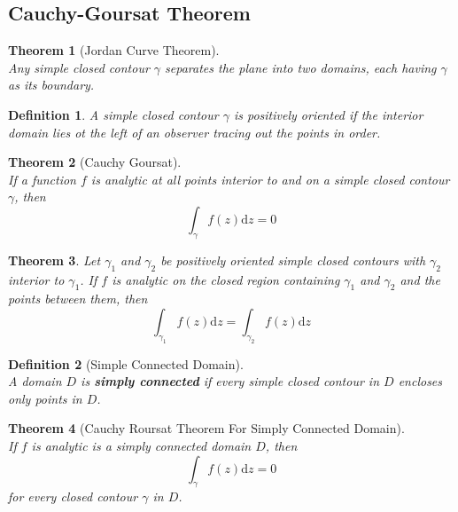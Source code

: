 \documentclass[12pt]{article}
\newcommand{\diff}{\mathrm{d}}
\newtheorem{definition}{Definition}[section]
\newtheorem{theorem}{Theorem}[section]
\theoremstyle{definition}
\begin{document}
\subsection{Cauchy-Goursat Theorem}
\begin{theorem}[Jordan Curve Theorem]
\hfill\\\normalfont Any simple closed contour $\gamma$ separates the plane into two domains, each having $\gamma$ as its boundary.
\end{theorem}
\begin{definition} \normalfont A simple closed contour $\gamma$ is positively oriented if the interior domain lies ot the left of an observer tracing out the points in order.
\end{definition}
\begin{theorem}[Cauchy Goursat]
\hfill\\\normalfont If a function $f$ is analytic at all points interior to and on a simple closed contour $\gamma$, then
\[
\int_{\gamma}f(z)\diff z = 0
\]
\end{theorem}
\begin{theorem}\normalfont Let $\gamma_1$ and $\gamma_2$ be positively oriented simple closed contours with $\gamma_2$ interior to $\gamma_1$. If $f$ is analytic on the closed region containing $\gamma_1$ and $\gamma_2$ and the points between them, then
\[
\int_{\gamma_1}f(z)\diff z = \int_{\gamma_2}f(z)\diff z
\]
\end{theorem}
\begin{definition}[Simple Connected Domain]
\hfill\\\normalfont A domain $D$ is \textbf{simply connected} if every simple closed contour in $D$ encloses only points in $D$.
\end{definition}
\begin{theorem}[Cauchy Roursat Theorem For Simply Connected Domain]
\hfill\\\normalfont If $f$ is analytic is a simply connected domain $D$, then
\[
\int_{\gamma}f(z)\diff z = 0
\]
for every closed contour $\gamma$ in $D$.
\end{theorem}
\end{document}
